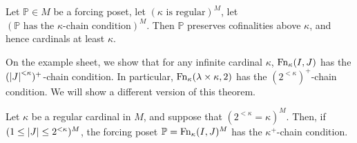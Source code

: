 \begin{theorem}
    Let \( \mathbb P \in M \) be a forcing poset, let \( (\kappa \text{ is regular})^M \), let \( (\mathbb P \text{ has the } \kappa \text{-chain condition})^M \).
    Then \( \mathbb P \) preserves cofinalities above \( \kappa \), and hence cardinals at least \( \kappa \).
\end{theorem}
On the example sheet, we show that for any infinite cardinal \( \kappa \), \( \operatorname{Fn}_\kappa(I, J) \) has the \( (\abs{J}^{<\kappa})^+ \)-chain condition.
In particular, \( \operatorname{Fn}_\kappa(\lambda \times \kappa, 2) \) has the \( (2^{<\kappa})^+ \)-chain condition.
We will show a different version of this theorem.
\begin{lemma}
    Let \( \kappa \) be a regular cardinal in \( M \), and suppose that \( (2^{<\kappa} = \kappa)^M \).
    Then, if \( (1 \leq \abs{J} \leq 2^{<\kappa})^M \), the forcing poset \( \mathbb P = \operatorname{Fn}_\kappa(I, J)^M \) has the \( \kappa^+ \)-chain condition.
\end{lemma}
